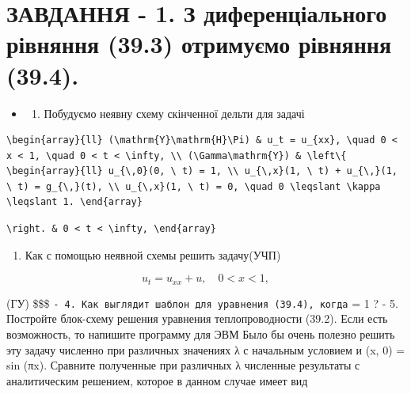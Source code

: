 \documentclass[
  ukrainian,
]{article}
\providecommand{\tightlist}{%
  \setlength{\itemsep}{0pt}\setlength{\parskip}{0pt}}
\begin{document}
\section{ЗАВДАННЯ - 1. З диференціального рівняння (39.3) отримуємо
рівняння
(39.4).}\label{ux437ux430ux432ux434ux430ux43dux43dux44f---1.-ux437-ux434ux438ux444ux435ux440ux435ux43dux446ux456ux430ux43bux44cux43dux43eux433ux43e-ux440ux456ux432ux43dux44fux43dux43dux44f-39.3-ux43eux442ux440ux438ux43cux443ux454ux43cux43e-ux440ux456ux432ux43dux44fux43dux43dux44f-39.4.}

\begin{itemize}
\tightlist
\item
  \begin{enumerate}
  \def\labelenumi{\arabic{enumi}.}
  \setcounter{enumi}{1}
  \tightlist
  \item
    Побудуємо неявну схему скінченної дельти для задачі
  \end{enumerate}
\end{itemize}

\begin{verbatim}
\begin{array}{ll} (\mathrm{Y}\mathrm{H}\Pi) & u_t = u_{xx}, \quad 0 < x < 1, \quad 0 < t < \infty, \\ (\Gamma\mathrm{Y}) & \left\{ \begin{array}{ll} u_{\,0}(0, \ t) = 1, \\ u_{\,x}(1, \ t) + u_{\,}(1, \ t) = g_{\,}(t), \\ u_{\,x}(1, \ t) = 0, \quad 0 \leqslant \kappa \leqslant 1. \end{array}
\end{verbatim}

\begin{verbatim}
\right. & 0 < t < \infty, \end{array}
\end{verbatim}

\begin{enumerate}
\def\labelenumi{\arabic{enumi}.}
\setcounter{enumi}{2}
\tightlist
\item
  Как с помощью неявной схемы решить задачу(УЧП)
\end{enumerate}

\[
u_t = u_{xx} + u, \quad 0 < x < 1,
\]

(ГУ) \$\$\$
\texttt{-\ 4.\ Как\ выглядит\ шаблон\ для\ уравнения\ (39.4),\ когда}
\lambda = 1 ? - 5. Постройте блок-схему решения уравнения
теплопроводности (39.2). Если есть возможность, то напишите программу
для ЭВМ Было бы очень полезно решить эту задачу численно при различных
значениях λ с начальным условием и (x, 0) = sin (πx). Сравните
полученные при различных λ численные результаты с аналитическим
решением, которое в данном случае имеет вид
\end{document}
